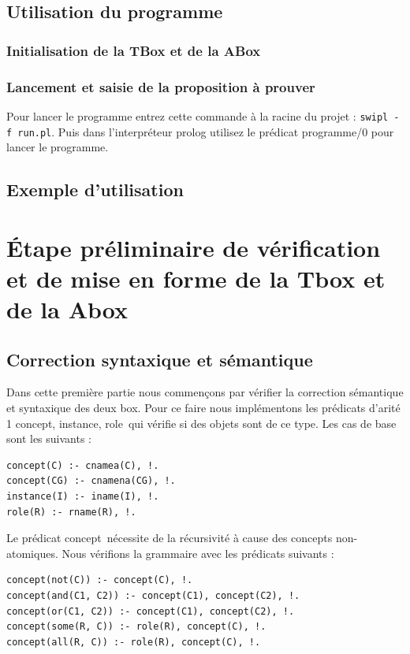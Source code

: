 \documentclass{article}
\begin{document}
\subsection{Utilisation du programme}
\subsubsection{Initialisation de la TBox et de la ABox}

\subsubsection{Lancement et saisie de la proposition à prouver}
Pour lancer le programme entrez cette commande à la racine du projet : \verb|swipl -f run.pl|. Puis dans l'interpréteur prolog utilisez le prédicat \color{blue} programme/0 \color{black} pour lancer le programme.


\subsection{Exemple d'utilisation}


\section{\'Etape préliminaire de vérification et de mise en forme de la Tbox et de la Abox}
\subsection{Correction syntaxique et sémantique}
Dans cette première partie nous commençons par vérifier la correction sémantique et syntaxique des deux box. Pour ce faire nous implémentons les prédicats d'arité 1 \color{blue}concept, instance, role\color{black}\ qui vérifie si des objets sont de ce type. Les cas de base sont les suivants :

\begin{verbatim}
concept(C) :- cnamea(C), !.
concept(CG) :- cnamena(CG), !. 
instance(I) :- iname(I), !.
role(R) :- rname(R), !. 
\end{verbatim}

Le prédicat \color{blue}concept\color{black}\ nécessite de la récursivité à cause des concepts non-atomiques. Nous vérifions la grammaire avec les prédicats suivants :

\begin{verbatim}
concept(not(C)) :- concept(C), !.
concept(and(C1, C2)) :- concept(C1), concept(C2), !.
concept(or(C1, C2)) :- concept(C1), concept(C2), !.
concept(some(R, C)) :- role(R), concept(C), !.
concept(all(R, C)) :- role(R), concept(C), !.
\end{verbatim}
\end{document}
